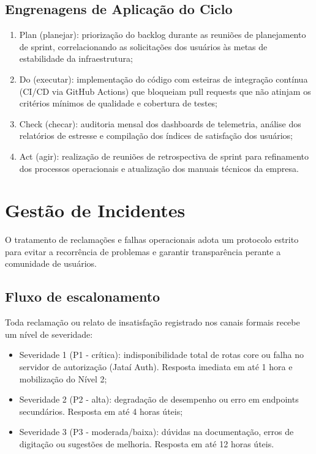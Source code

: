 \documentclass[
  12pt,
  openright,
  oneside,
  a4paper,
  brazilian
]{abntex2}
\begin{document}
\subsection{Engrenagens de Aplicação do Ciclo}
\begin{enumerate}
    \item{Plan (planejar):} priorização do backlog durante as reuniões de planejamento de sprint, correlacionando as solicitações dos usuários às metas de estabilidade da infraestrutura;
    \item{Do (executar):} implementação do código com esteiras de integração contínua (CI/CD via GitHub Actions) que bloqueiam pull requests que não atinjam os critérios mínimos de qualidade e cobertura de testes;
    \item{Check (checar):} auditoria mensal dos dashboards de telemetria, análise dos relatórios de estresse e compilação dos índices de satisfação dos usuários;
    \item{Act (agir):} realização de reuniões de retrospectiva de sprint para refinamento dos processos operacionais e atualização dos manuais técnicos da empresa.
\end{enumerate}

\section{Gestão de Incidentes}
\label{sec:tratamento_reclamacoes}

O tratamento de reclamações e falhas operacionais adota um protocolo estrito para evitar a recorrência de problemas e garantir transparência perante a comunidade de usuários.

\subsection{Fluxo de escalonamento}
Toda reclamação ou relato de insatisfação registrado nos canais formais recebe um nível de severidade:
\begin{itemize}
    \item{Severidade 1 (P1 - crítica):} indisponibilidade total de rotas core ou falha no servidor de autorização (Jataí Auth). Resposta imediata em até 1 hora e mobilização do Nível 2;
    \item{Severidade 2 (P2 - alta):} degradação de desempenho ou erro em endpoints secundários. Resposta em até 4 horas úteis;
    \item{Severidade 3 (P3 - moderada/baixa):} dúvidas na documentação, erros de digitação ou sugestões de melhoria. Resposta em até 12 horas úteis.
\end{itemize}
\end{document}

